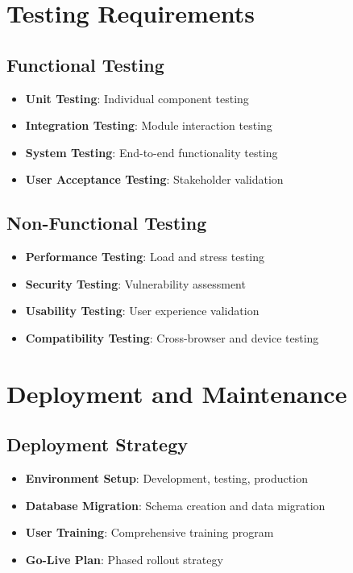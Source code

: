 \documentclass[12pt,a4paper]{article}
\begin{document}
\section{Testing Requirements}

\subsection{Functional Testing}
\begin{itemize}
    \item \textbf{Unit Testing}: Individual component testing
    \item \textbf{Integration Testing}: Module interaction testing
    \item \textbf{System Testing}: End-to-end functionality testing
    \item \textbf{User Acceptance Testing}: Stakeholder validation
\end{itemize}

\subsection{Non-Functional Testing}
\begin{itemize}
    \item \textbf{Performance Testing}: Load and stress testing
    \item \textbf{Security Testing}: Vulnerability assessment
    \item \textbf{Usability Testing}: User experience validation
    \item \textbf{Compatibility Testing}: Cross-browser and device testing
\end{itemize}

\section{Deployment and Maintenance}

\subsection{Deployment Strategy}
\begin{itemize}
    \item \textbf{Environment Setup}: Development, testing, production
    \item \textbf{Database Migration}: Schema creation and data migration
    \item \textbf{User Training}: Comprehensive training program
    \item \textbf{Go-Live Plan}: Phased rollout strategy
\end{itemize}
\end{document}
